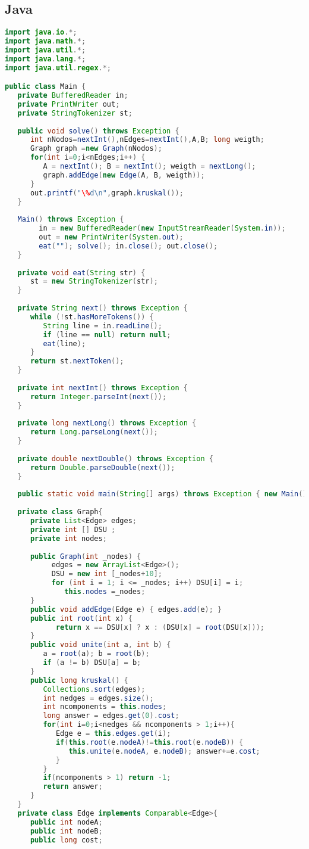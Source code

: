 \subsection{Java}

\begin{lstlisting}[language=Java]
import java.io.*;
import java.math.*;
import java.util.*;
import java.lang.*;
import java.util.regex.*;

public class Main {
   private BufferedReader in;
   private PrintWriter out;
   private StringTokenizer st;
	
   public void solve() throws Exception {
      int nNodos=nextInt(),nEdges=nextInt(),A,B; long weigth;
      Graph graph =new Graph(nNodos);
      for(int i=0;i<nEdges;i++) {
         A = nextInt(); B = nextInt(); weigth = nextLong();
         graph.addEdge(new Edge(A, B, weigth));
      }
      out.printf("\%d\n",graph.kruskal());
   }
	
   Main() throws Exception {
		in = new BufferedReader(new InputStreamReader(System.in));
		out = new PrintWriter(System.out);
		eat(""); solve(); in.close(); out.close();
   }
	
   private void eat(String str) {
      st = new StringTokenizer(str);
   }
	
   private String next() throws Exception {
      while (!st.hasMoreTokens()) {
         String line = in.readLine();
         if (line == null) return null;
         eat(line);
      }
      return st.nextToken();
   }
	
   private int nextInt() throws Exception {
      return Integer.parseInt(next());
   }
	
   private long nextLong() throws Exception {
      return Long.parseLong(next());
   }
	
   private double nextDouble() throws Exception {
      return Double.parseDouble(next());
   }
	
   public static void main(String[] args) throws Exception { new Main();}
	
   private class Graph{
      private List<Edge> edges;
      private int [] DSU ;
      private int nodes;
      
      public Graph(int _nodes) {
      	   edges = new ArrayList<Edge>();
      	   DSU = new int [_nodes+10];
      	   for (int i = 1; i <= _nodes; i++) DSU[i] = i;
      	      this.nodes =_nodes;
      }
      public void addEdge(Edge e) { edges.add(e); }
      public int root(int x) {
			return x == DSU[x] ? x : (DSU[x] = root(DSU[x]));
      }
      public void unite(int a, int b) {
         a = root(a); b = root(b);
         if (a != b) DSU[a] = b;
      }
      public long kruskal() { 
         Collections.sort(edges);
         int nedges = edges.size();
         int ncomponents = this.nodes;
         long answer = edges.get(0).cost;
		 for(int i=0;i<nedges && ncomponents > 1;i++){
            Edge e = this.edges.get(i);
            if(this.root(e.nodeA)!=this.root(e.nodeB)) {
               this.unite(e.nodeA, e.nodeB); answer+=e.cost;
            }
         }
         if(ncomponents > 1) return -1;
         return answer;
      }
   }
   private class Edge implements Comparable<Edge>{
      public int nodeA;
      public int nodeB;
      public long cost;
		

\end{lstlisting}
